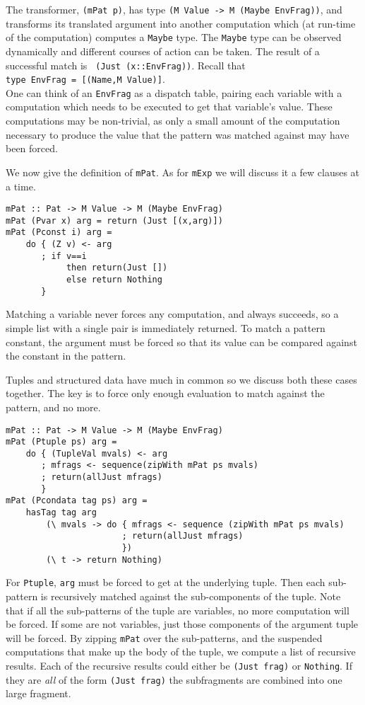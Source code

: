 \documentclass{entcs} \usepackage{entcsmacro}
\begin{document}
The transformer, {\tt (mPat p)}, has type {\tt (M Value -> M (Maybe EnvFrag))}, and
transforms its translated argument into another computation which (at run-time of the
computation) computes a {\tt Maybe} type. The {\tt Maybe} type can be observed dynamically
and different courses of action can be taken. The result of a successful match is {\tt
(Just (x::EnvFrag))}. Recall that\\ \verb+type EnvFrag = [(Name,M Value)]+.\\ One can
think of an {\tt EnvFrag} as a dispatch table, pairing each variable with a computation
which needs to be executed to get that variable's value. These computations may be
non-trivial, as only a small amount of the computation necessary to produce the value that
the pattern was matched against may have been forced.

We now give the definition of {\tt mPat}. As for {\tt mExp} we will discuss
it a few clauses at a time.

{\small
\begin{verbatim}
mPat :: Pat -> M Value -> M (Maybe EnvFrag)
mPat (Pvar x) arg = return (Just [(x,arg)])
mPat (Pconst i) arg = 
    do { (Z v) <- arg
       ; if v==i 
            then return(Just [])
            else return Nothing
       }
\end{verbatim}
}

Matching a variable never forces any computation, and always succeeds, so a simple list
with a single pair is immediately returned. To match a pattern constant, the argument
must be forced so that its value can be compared against the constant in the pattern.

Tuples and structured data have much in common so we discuss both these cases
together. The key is to force only enough evaluation to match against
the pattern, and no more.


{\small
\begin{verbatim}  
mPat :: Pat -> M Value -> M (Maybe EnvFrag)
mPat (Ptuple ps) arg = 
    do { (TupleVal mvals) <- arg
       ; mfrags <- sequence(zipWith mPat ps mvals)
       ; return(allJust mfrags)
       }
mPat (Pcondata tag ps) arg = 
    hasTag tag arg
        (\ mvals -> do { mfrags <- sequence (zipWith mPat ps mvals)
                       ; return(allJust mfrags)
                       })
        (\ t -> return Nothing)

\end{verbatim}
}

For {\tt Ptuple}, {\tt arg} must be forced to get at the underlying tuple. Then each
sub-pattern is recursively matched against the sub-components of the tuple. Note that
if all the sub-patterns of the tuple are variables, no more computation will be
forced. If some are not variables, just those components of the argument tuple will be
forced. By zipping {\tt mPat} over the sub-patterns, and the suspended computations
that make up the body of the tuple, we compute a list of recursive results.
Each of the recursive results could either be {\tt (Just frag)} or {\tt Nothing}. If
they are {\em all} of the form {\tt (Just frag)} the subfragments are combined
into one large fragment.
\end{document}
